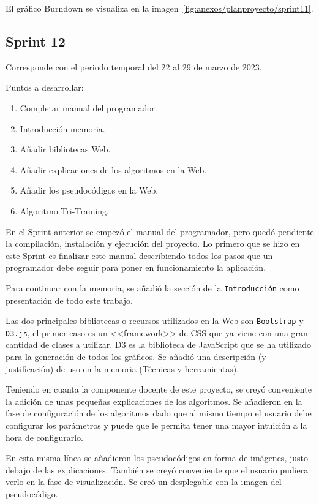 El gráfico Burndown se visualiza en la imagen~\ref{fig:anexos/planproyecto/sprint11}.


\subsection{Sprint 12}
Corresponde con el periodo temporal del 22 al 29 de marzo de 2023.

Puntos a desarrollar:
\begin{enumerate}
    \item Completar manual del programador.
    \item Introducción memoria.
    \item Añadir bibliotecas Web.
    \item Añadir explicaciones de los algoritmos en la Web.
    \item Añadir los pseudocódigos en la Web.
    \item Algoritmo Tri-Training.
\end{enumerate}

En el Sprint anterior se empezó el manual del programador, pero quedó pendiente
la compilación, instalación y ejecución del proyecto. Lo primero que se hizo en
este Sprint es finalizar este manual describiendo todos los pasos que un
programador debe seguir para poner en funcionamiento la aplicación.

Para continuar con la memoria, se añadió la sección de la \texttt{Introducción}
como presentación de todo este trabajo.

Las dos principales bibliotecas o recursos utilizados en la Web son
\texttt{Bootstrap} y \texttt{D3.js}, el primer caso es un <<framework>> de CSS
que ya viene con una gran cantidad de clases a utilizar. D3 es la biblioteca de
JavaScript que se ha utilizado para la generación de todos los gráficos. Se
añadió una descripción (y justificación) de uso en la memoria (Técnicas y
herramientas).

Teniendo en cuanta la componente docente de este proyecto, se creyó conveniente
la adición de unas pequeñas explicaciones de los algoritmos. Se añadieron en la
fase de configuración de los algoritmos dado que al mismo tiempo el usuario debe
configurar los parámetros y puede que le permita tener una mayor intuición a la
hora de configurarlo.

En esta misma línea se añadieron los pseudocódigos en forma de imágenes, justo
debajo de las explicaciones. También se creyó conveniente que el usuario pudiera
verlo en la fase de visualización. Se creó un desplegable con la imagen del
pseudocódigo.

